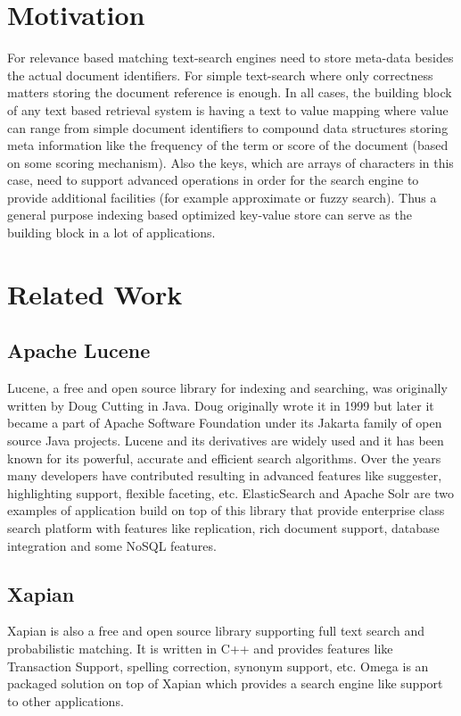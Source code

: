 \section{Motivation}
For relevance based matching text-search engines need to store meta-data besides the actual document identifiers.
For simple text-search where only correctness matters storing the document reference is enough.
In all cases, the building block of any text based retrieval system is having a text to value mapping where
value can range from simple document identifiers to compound data structures storing meta information like the frequency
of the term or score of the document (based on some scoring mechanism).
Also the keys, which are arrays of characters in this case, need to support advanced operations in order for
the search engine to provide additional facilities (for example approximate or fuzzy search).
Thus a general purpose indexing based optimized key-value store can serve as the building block in a lot of applications.

\section{Related Work}

\subsection{Apache Lucene}
Lucene, a free and open source library for indexing and searching, was originally written by Doug Cutting\cite{goetz2000lucene}
in Java. Doug originally wrote it in 1999 but later it became a part of Apache Software Foundation under its Jakarta family
of open source Java projects.
Lucene and its derivatives are widely used and it has been known for its powerful, accurate and efficient search algorithms.
Over the years many developers have contributed resulting in advanced features like suggester, highlighting support, flexible faceting, etc.
ElasticSearch and Apache Solr are two examples of application build on top of this library that provide enterprise class search
platform with features like replication, rich document support, database integration and some NoSQL features.

\subsection{Xapian}
Xapian is also a free and open source library supporting full text search and probabilistic matching.
It is written in C++ and provides features like Transaction Support, spelling correction, synonym support, etc.
Omega is an packaged solution on top of Xapian which provides a search engine like support to other applications.

